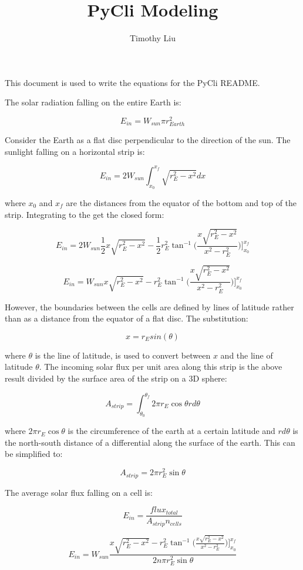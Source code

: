 \documentclass[12pt]{article} %
\title{PyCli Modeling}
\author{Timothy Liu}
\begin{document}
\maketitle

This document is used to write the equations for the PyCli README.

The solar radiation falling on the entire Earth is:

$$E_{in} = W_{sun} \pi r_{Earth}^2$$

Consider the Earth as a flat disc perpendicular to the direction of the sun. The sunlight falling on a horizontal strip is:

$$E_{in} = 2 W_{sun} \int_{x_0}^{x_f} \sqrt{r_{E}^2 - x^2} dx$$


where $x_0$ and $x_f$ are the distances from the equator of the bottom and top of the strip. Integrating to the get the closed form:

$$E_{in} = 2 W_{sun} \frac{1}{2} x \sqrt{r_{E}^2 - x^2} - \frac{1}{2} r_{E}^2 \tan^{-1}\bigg({\frac{x \sqrt{r_{E}^2 - x^2}}{x^2 - r_{E}^2 }}\bigg)\bigg]_{x_0}^{x_f}$$

$$E_{in} = W_{sun} x \sqrt{r_{E}^2 - x^2} -  r_{E}^2 \tan^{-1}\bigg({\frac{x \sqrt{r_{E}^2 - x^2}}{x^2 - r_{E}^2 }}\bigg)\bigg]_{x_0}^{x_f}$$

However, the boundaries between the cells are defined by lines of latitude rather than as a distance from the equator of a flat disc. The substitution: 

$$x = r_{E} sin(\theta) $$

where $\theta$ is the line of latitude, is used to convert between $x$ and the line of latitude $\theta$. The incoming solar flux per
unit area along this strip is the above result divided by the surface area of the strip on a 3D sphere:

$$A_{strip} = \int_{\theta_{0}}^{\theta_{f}} 2 \pi r_{E} \cos{\theta} r d\theta $$

where $2 \pi r_{E} \cos{\theta}$ is the circumference of the earth at a certain latitude and $r d\theta$ is the north-south distance of a differential along the surface of the earth. This can be simplified to:

$$A_{strip} =  2 \pi r_{E}^2 \sin{\theta} $$

The average solar flux falling on a cell is:

$$E_{in} = \frac{flux_{total}}{A_{strip} n_{cells}}$$

$$\boxed{E_{in} = W_{sun}\frac{x \sqrt{r_{E}^2 - x^2} -  r_{E}^2 \tan^{-1}\bigg({\frac{x \sqrt{r_{E}^2 - x^2}}{x^2 - r_{E}^2 }}\bigg)\bigg]_{x_0}^{x_f}}{2n \pi r_{E}^2 \sin{\theta}}}$$
\end{document}
